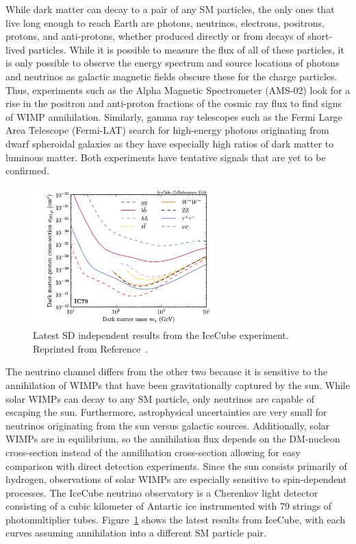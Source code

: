 While dark matter can decay to a pair of any SM particles, the only ones that live long enough to reach Earth are photons, neutrinos, electrons, positrons, protons, and anti-protons, whether produced directly or from decays of short-lived particles.
While it is possible to measure the flux of all of these particles, it is only possible to observe the energy spectrum and source locations of photons and neutrinos as galactic magnetic fields obscure these for the charge particles.
Thus, experiments such as the Alpha Magnetic Spectrometer (AMS-02) look for a rise in the positron and anti-proton fractions of the cosmic ray flux to find signs of WIMP annihilation. %
Similarly, gamma ray telescopes such as the Fermi Large Area Telescope (Fermi-LAT) search for high-energy photons originating from dwarf spheroidal galaxies as they have especially high ratios of dark matter to luminous matter. %
Both experiments have tentative signals that are yet to be confirmed.

\begin{figure}[htbp]
  \centering
  \includegraphics[width=0.625\textwidth]{DarkMatter/Figures/icecube.png}
  \caption{
    Latest SD independent results from the IceCube experiment.
    Reprinted from Reference~\cite{}. %
  }
  \label{fig:dm_icecube}
\end{figure}

The neutrino channel differs from the other two because it is sensitive to the annihilation of WIMPs that have been gravitationally captured by the sun. %
While solar WIMPs can decay to any SM particle, only neutrinos are capable of escaping the sun.
Furthermore, astrophysical uncertainties are very small for neutrinos originating from the sun versus galactic sources.
Additionally, solar WIMPs are in equilibrium, so the annihilation flux depends on the DM-nucleon cross-section instead of the annilihation cross-section allowing for easy comparison with direct detection experiments.
Since the sun consists primarily of hydrogen, observations of solar WIMPs are especially sensitive to spin-dependent processes.
The IceCube neutrino observatory is a Cherenkov light detector consisting of a cubic kilometer of Antartic ice instrumented with 79 strings of photomultiplier tubes.
Figure~\ref{fig:dm_icecube} shows the latest results from IceCube, with each curves assuming annihilation into a different SM particle pair. %

